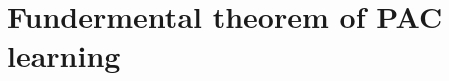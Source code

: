 \documentclass{article}
\begin{document}
%  
%
%
%
%
%
%
%
%
%
%
%
%
%
%
%
%
\section{Fundermental theorem of PAC learning}
%
%
%
%
%
%
%
%
%
%
%
%
%
%
%
%
%
\end{document}
